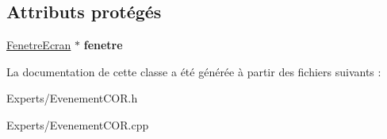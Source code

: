 \subsection*{Attributs protégés}
\begin{DoxyCompactItemize}
\item 
\mbox{\label{class_evenement_c_o_r_a45e506681a748d17833a9a0453aa0660}} 
\mbox{\hyperlink{class_fenetre_ecran}{Fenetre\+Ecran}} $\ast$ {\bfseries fenetre}
\end{DoxyCompactItemize}


La documentation de cette classe a été générée à partir des fichiers suivants \+:\begin{DoxyCompactItemize}
\item 
Experts/Evenement\+C\+O\+R.\+h\item 
Experts/Evenement\+C\+O\+R.\+cpp\end{DoxyCompactItemize}
